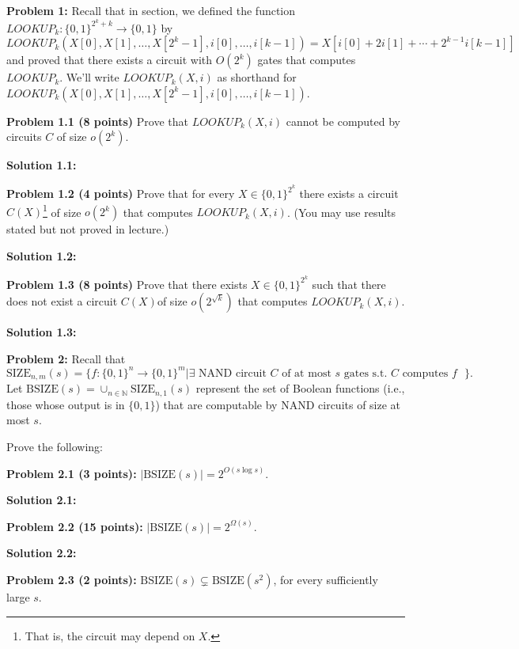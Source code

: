 \documentclass[11pt]{article}
\begin{document}
\newcommand{\N}{\mathbb{N}} 
\newcommand{\XOR}{\mathrm{XOR}} 
\newcommand{\Size}{\mathrm{SIZE}} 

\textbf{Problem 1:}
Recall that in section, we defined the function $LOOKUP_k: \{0,1\}^{2^k + k} \to \{0,1\}$ by 
$$LOOKUP_k(X[0], X[1], \ldots, X[2^{k}-1], i[0], \ldots, i[k-1]) = X[i[0] + 2 i[1] + \cdots + 2^{k-1}i[k-1]]$$ 
and proved that there exists a circuit with $O(2^k)$ gates that computes $LOOKUP_k$. We'll write $LOOKUP_k(X, i)$ as shorthand for $LOOKUP_k(X[0], X[1], \ldots, X[2^{k}-1], i[0], \ldots, i[k-1])$.

\textbf{Problem 1.1 (8 points)} Prove that $LOOKUP_k(X,i)$ cannot be computed by circuits $C$ of size $o(2^k)$.

\textbf{Solution 1.1:}%

\textbf{Problem 1.2 (4 points)} Prove that for every $X \in \{0,1\}^{2^k}$ there exists a circuit $C(X)$\footnote{That is, the circuit may depend on $X$.} of size $o(2^k)$ that computes $LOOKUP_k(X,i)$. (You may use results stated but not proved in lecture.)

\textbf{Solution 1.2:}%

\textbf{Problem 1.3 (8 points)} Prove that there exists $X \in \{0,1\}^{2^k}$ such that there does not exist a circuit $C(X)$\footnotemark[1] of size $o(2^{\sqrt k})$ that computes $LOOKUP_k(X,i)$.

\textbf{Solution 1.3:}%

\newcommand{\BSize}{\mathrm{BSIZE}}

\textbf{Problem 2:}
Recall that 
$$\Size_{n,m}(s) = \{f:\{0,1\}^n \to \{0,1\}^m | \exists \mbox{ NAND circuit $C$ of at most $s$ gates s.t. $C$ computes $f$ }\}.$$ 
Let $\BSize(s) = \cup_{n \in \N}  \Size_{n,1}(s)$ represent the set of Boolean functions (i.e., those whose output is in $\{0,1\}$) that are computable by NAND circuits of size at most $s$.

Prove the following:

\textbf{Problem 2.1 (3 points):} $|\BSize(s)| =  2^{O(s \log s)}$. 

\textbf{Solution 2.1:}%

\textbf{Problem 2.2 (15 points):} $|\BSize(s)| = 2^{\Omega(s)}$.

\textbf{Solution 2.2:}%

\textbf{Problem 2.3 (2 points):} $\BSize(s) \subsetneq \BSize(s^2)$, for every sufficiently large $s$.  
\end{document}
